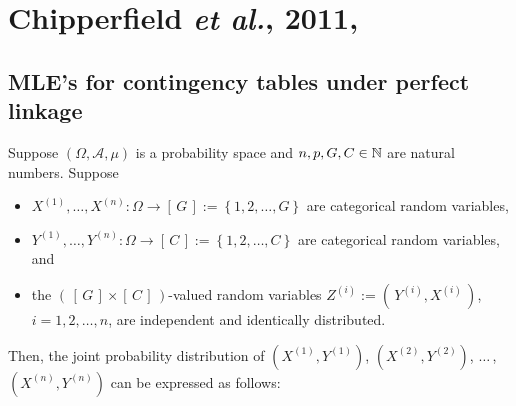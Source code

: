 

\section{Chipperfield \textit{et al.}, 2011, \cite{Chipperfield2011}}
\setcounter{theorem}{0}
\setcounter{equation}{0}

\renewcommand{\theenumi}{\roman{enumi}}
\renewcommand{\labelenumi}{\textnormal{(\theenumi)}$\;\;$}


\subsection{MLE's for contingency tables under perfect linkage}
Suppose
$\left(\Omega,\mathcal{A},\mu\right)$ is a probability space and
$n, p, G, C \in \mathbb{N}$ are natural numbers.
Suppose
\begin{itemize}
\item
	$X^{(1)}, \ldots, X^{(n)} : \Omega \longrightarrow \left[\,G\,\right] := \left\{1,2,\ldots,G\right\}$
	are categorical random variables,
\item
	$Y^{(1)}, \ldots, Y^{(n)} : \Omega \longrightarrow \left[\,C\,\right] := \left\{1,2,\ldots,C\right\}$
	are categorical random variables, and
\item
	the $\left(\,\left[\,G\,\right] \times \left[\,C\,\right]\,\right)$-valued random variables
	$Z^{(i)} := \left(\,Y^{(i)},X^{(i)}\,\right)$, $i = 1, 2, \ldots, n$, are independent and identically distributed.
\end{itemize}
Then, the joint probability distribution of
$\left(X^{(1)},Y^{(1)}\right)$, $\left(X^{(2)},Y^{(2)}\right)$, $\ldots$\,, $(X^{(n)},Y^{(n)})$
can be expressed as follows:
